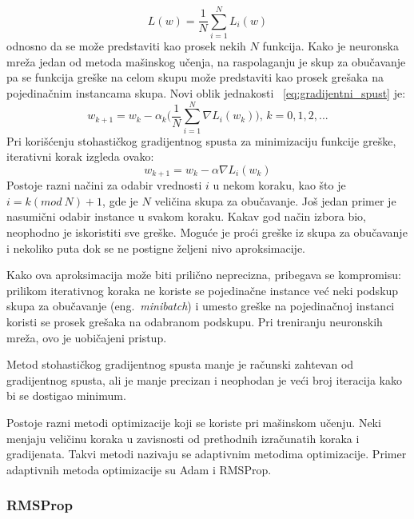 \begin{equation}
		L(w) = \frac{1}{N}\sum_{i=1}^{N} L_i(w)	
\end{equation}
odnosno da se može predstaviti kao prosek nekih $N$ funkcija. Kako je neuronska mreža jedan od metoda mašinskog učenja, na raspolaganju je skup za obučavanje pa se funkcija greške na celom skupu može predstaviti kao prosek grešaka na pojedinačnim instancama skupa. Novi oblik 
jednakosti ~\eqref{eq:gradijentni_spust} je:
\begin{equation}
	w_{k+1} = w_k - \alpha_k \bigg( \frac{1}{N}\sum_{i=1}^{N} \nabla L_i(w_k) \bigg)\text{,~} k=0,1,2, ... 
\end{equation}
Pri korišćenju stohastičkog gradijentnog spusta za minimizaciju funkcije greške, iterativni korak izgleda ovako:
\begin{equation}
	w_{k+1} = w_k - \alpha \nabla L_i(w_k) 
\end{equation}
Postoje razni načini za odabir vrednosti $i$ u nekom koraku, kao što je $i=k (mod~N) + 1$, gde je $N$ veličina skupa za obučavanje. Još jedan primer je nasumični odabir instance u svakom koraku. Kakav god način izbora bio, neophodno je iskoristiti sve greške. Moguće je proći greške iz skupa za obučavanje i nekoliko puta dok se ne postigne željeni nivo aproksimacije. 
\par
Kako ova aproksimacija može biti prilično neprecizna, pribegava se kompromisu: prilikom iterativnog koraka ne koriste se pojedinačne instance već neki podskup skupa za obučavanje (eng.~{\em minibatch}) i umesto greške na pojedinačnoj instanci koristi se prosek grešaka na odabranom podskupu. Pri treniranju neuronskih mreža, ovo je uobičajeni pristup.
\par
Metod stohastičkog gradijentnog spusta manje je računski zahtevan od gradijentnog spusta, ali je manje precizan i neophodan je veći broj iteracija kako bi se dostigao minimum.
\par
Postoje razni metodi optimizacije koji se koriste pri mašinskom učenju. Neki menjaju veličinu koraka u zavisnosti od prethodnih izračunatih koraka i gradijenata. Takvi metodi nazivaju se adaptivnim metodima optimizacije. Primer adaptivnih metoda optimizacije su Adam i RMSProp.

\subsubsection{RMSProp}

